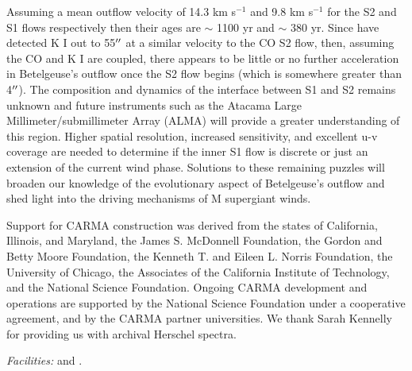 \documentclass[iop]{emulateapj}
\begin{document}
Assuming a mean outflow velocity of 14.3 km s${}^{-1}$ and 9.8 km s${}^{-1}$ for the S2 and S1 flows respectively then their ages are $\sim$ 1100 yr and $\sim$ 380 yr. Since \cite{2002A&A...386.1009P} have detected K I out to 55$\mbox{$^{\prime\prime}$}$ at a similar velocity to the CO S2 flow, then, assuming the CO and K I are coupled, there appears to be little or no further acceleration in Betelgeuse's outflow once the S2 flow begins (which is somewhere greater than 4$\mbox{$^{\prime\prime}$}$). The composition and dynamics of the interface between S1 and S2 remains unknown and future instruments such as the Atacama Large Millimeter/submillimeter Array (ALMA) will provide a greater understanding of this region. Higher spatial resolution, increased sensitivity, and excellent u-v coverage are needed to determine if the inner S1 flow is discrete or just an extension of the current wind phase. Solutions to these remaining puzzles will broaden our knowledge of the evolutionary aspect of Betelgeuse's outflow and shed light into the driving mechanisms of M supergiant winds.

\acknowledgments

Support for CARMA construction was derived from the states of California, Illinois, and Maryland, the James S. McDonnell Foundation, the Gordon and Betty Moore Foundation, the Kenneth T. and Eileen L. Norris Foundation, the University of Chicago, the Associates of the California Institute of Technology, and the National Science Foundation. Ongoing CARMA development and operations are supported by the National Science Foundation under a cooperative agreement, and by the CARMA partner universities. We thank Sarah Kennelly for providing us with archival Herschel spectra.

{\it Facilities:}  and .


\end{document}
